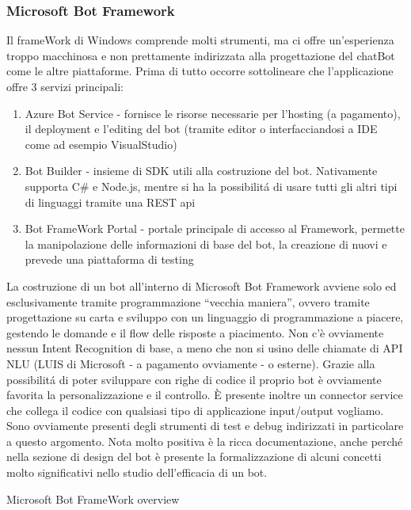 \documentclass[]{article}
\begin{document}
\subsubsection{Microsoft Bot Framework}
Il frameWork di Windows comprende molti strumenti, ma ci offre un’esperienza troppo macchinosa e non prettamente indirizzata alla progettazione del chatBot come le altre piattaforme. Prima di tutto occorre sottolineare che l’applicazione offre 3 servizi principali:
\begin{enumerate}
\item Azure Bot Service - fornisce le risorse necessarie per l’hosting (a pagamento), il deployment e l’editing del bot (tramite editor o interfacciandosi a IDE come ad esempio VisualStudio)
\item Bot Builder - insieme di SDK utili alla costruzione del bot. Nativamente supporta C\# e Node.js, mentre si ha la possibilitá di usare tutti gli altri tipi di linguaggi tramite una REST api
\item Bot FrameWork Portal - portale principale di accesso al Framework, permette la manipolazione delle informazioni di base del bot, la creazione di nuovi e prevede una piattaforma di testing
\end{enumerate}
La costruzione di un bot all’interno di Microsoft Bot Framework avviene solo ed esclusivamente tramite programmazione “vecchia maniera”, ovvero tramite progettazione su carta e sviluppo con un linguaggio di programmazione a piacere, gestendo le domande e il flow delle risposte a piacimento. Non c’è ovviamente nessun Intent Recognition di base, a meno che non si usino delle chiamate di API  NLU (LUIS di Microsoft - a pagamento ovviamente - o esterne). Grazie alla possibilitá di poter sviluppare con righe di codice il proprio bot è ovviamente favorita la personalizzazione e il controllo. È presente inoltre un connector service che collega il codice con qualsiasi tipo di applicazione input/output vogliamo. Sono ovviamente presenti degli strumenti di test e debug indirizzati in particolare a questo argomento. Nota molto positiva è la ricca documentazione, anche perché nella sezione di design del bot è presente la formalizzazione di alcuni concetti molto significativi nello studio dell’efficacia di un bot.
\begin{center}
\footnotesize{Microsoft Bot FrameWork overview}
\end{center}
\end{document}
